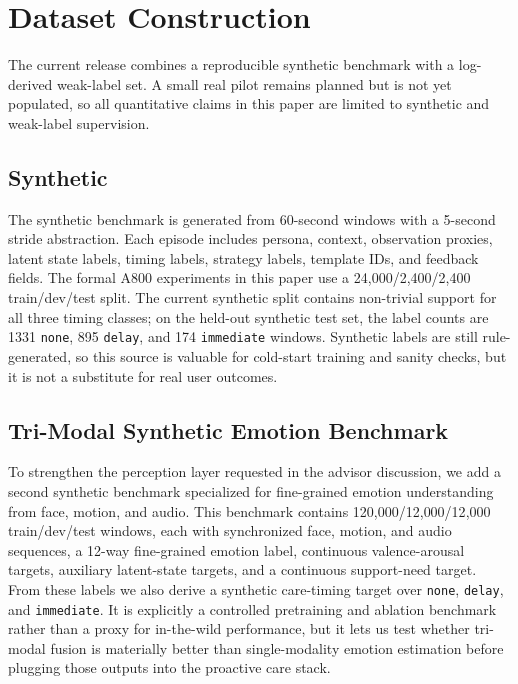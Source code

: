 \section{Dataset Construction}
The current release combines a reproducible synthetic benchmark with a log-derived weak-label set. A small real pilot remains planned but is not yet populated, so all quantitative claims in this paper are limited to synthetic and weak-label supervision.

\subsection{Synthetic}
The synthetic benchmark is generated from 60-second windows with a 5-second stride abstraction. Each episode includes persona, context, observation proxies, latent state labels, timing labels, strategy labels, template IDs, and feedback fields. The formal A800 experiments in this paper use a 24{,}000/2{,}400/2{,}400 train/dev/test split. The current synthetic split contains non-trivial support for all three timing classes; on the held-out synthetic test set, the label counts are 1331 \texttt{none}, 895 \texttt{delay}, and 174 \texttt{immediate} windows. Synthetic labels are still rule-generated, so this source is valuable for cold-start training and sanity checks, but it is not a substitute for real user outcomes.

\subsection{Tri-Modal Synthetic Emotion Benchmark}
To strengthen the perception layer requested in the advisor discussion, we add a second synthetic benchmark specialized for fine-grained emotion understanding from face, motion, and audio. This benchmark contains 120{,}000/12{,}000/12{,}000 train/dev/test windows, each with synchronized face, motion, and audio sequences, a 12-way fine-grained emotion label, continuous valence-arousal targets, auxiliary latent-state targets, and a continuous support-need target. From these labels we also derive a synthetic care-timing target over \texttt{none}, \texttt{delay}, and \texttt{immediate}. It is explicitly a controlled pretraining and ablation benchmark rather than a proxy for in-the-wild performance, but it lets us test whether tri-modal fusion is materially better than single-modality emotion estimation before plugging those outputs into the proactive care stack.

